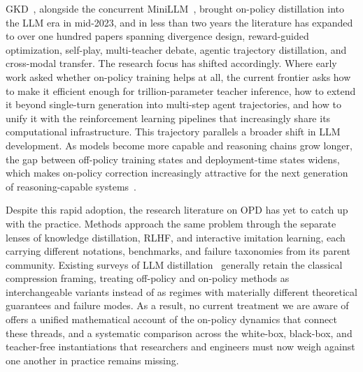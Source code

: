 \documentclass{article} %
\begin{document}
GKD~\citep{2306.13649}, alongside the concurrent MiniLLM~\citep{2306.08543}, brought on-policy distillation into the LLM era in mid-2023, and in less than two years the literature has expanded to over one hundred papers spanning divergence design, reward-guided optimization, self-play, multi-teacher debate, agentic trajectory distillation, and cross-modal transfer. The research focus has shifted accordingly. Where early work asked whether on-policy training helps at all, the current frontier asks how to make it efficient enough for trillion-parameter teacher inference, how to extend it beyond single-turn generation into multi-step agent trajectories, and how to unify it with the reinforcement learning pipelines that increasingly share its computational infrastructure. This trajectory parallels a broader shift in LLM development. As models become more capable and reasoning chains grow longer, the gap between off-policy training states and deployment-time states widens, which makes on-policy correction increasingly attractive for the next generation of reasoning-capable systems~\citep{2603.25562,deepseekv4}.

Despite this rapid adoption, the research literature on OPD has yet to catch up with the practice. Methods approach the same problem through the separate lenses of knowledge distillation, RLHF, and interactive imitation learning, each carrying different notations, benchmarks, and failure taxonomies from its parent community. Existing surveys of LLM distillation~\citep{2402.13116} generally retain the classical compression framing, treating off-policy and on-policy methods as interchangeable variants instead of as regimes with materially different theoretical guarantees and failure modes. As a result, no current treatment we are aware of offers a unified mathematical account of the on-policy dynamics that connect these threads, and a systematic comparison across the white-box, black-box, and teacher-free instantiations that researchers and engineers must now weigh against one another in practice remains missing.
\end{document}
